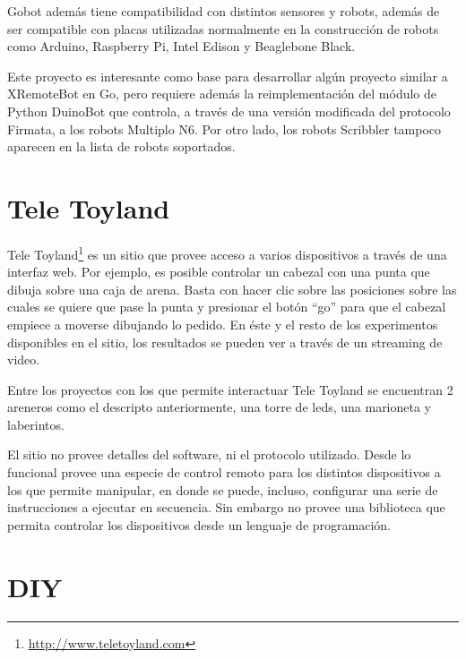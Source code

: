 Gobot además tiene compatibilidad con distintos sensores y robots, además de
ser compatible con
placas utilizadas normalmente en la construcción de robots como Arduino,
Raspberry Pi, Intel Edison y Beaglebone Black.

Este proyecto es interesante como base para desarrollar algún proyecto
similar a XRemoteBot en Go, pero requiere además la reimplementación
del módulo de Python DuinoBot que controla, a través de una versión
modificada del protocolo Firmata, a los robots Multiplo N6. Por otro
lado, los robots Scribbler tampoco aparecen en la lista de robots soportados.

\section{Tele Toyland}

Tele Toyland\footnote{\url{http://www.teletoyland.com}} es un sitio que provee acceso a varios dispositivos a través de una interfaz
web. Por ejemplo, es posible controlar un cabezal con una punta que dibuja sobre
una caja de arena. Basta con hacer clic sobre las posiciones sobre las cuales
se quiere que pase la punta y presionar el botón ``go'' para que el cabezal
empiece a moverse dibujando lo pedido. En éste y el resto de los experimentos
disponibles en el sitio, los resultados se pueden ver a través de un streaming
de video.

Entre los proyectos con los que permite interactuar Tele Toyland
se encuentran  2 areneros como el descripto
anteriormente, una torre de leds, una marioneta y laberintos.

El sitio no provee detalles del software, ni el protocolo utilizado. Desde
lo funcional
provee una especie de control remoto para los distintos dispositivos a los
que permite
manipular, en donde se puede, incluso, configurar una serie de instrucciones a ejecutar
en secuencia. Sin embargo no provee una biblioteca que permita controlar
los dispositivos desde un lenguaje de programación.


\section{DIY}



